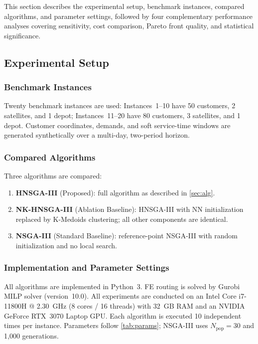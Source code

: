 \documentclass[11pt, a4paper]{article}
\numberwithin{equation}{section}
\begin{document}
This section describes the experimental setup, benchmark instances, compared
algorithms, and parameter settings, followed by four complementary performance
analyses covering sensitivity, cost comparison, Pareto front quality, and
statistical significance.

\subsection{Experimental Setup}

\subsubsection{Benchmark Instances}

Twenty benchmark instances are used: Instances~1--10 have 50 customers,
2 satellites, and 1 depot; Instances~11--20 have 80 customers, 3 satellites,
and 1 depot.  Customer coordinates, demands, and soft service-time windows
are generated synthetically over a multi-day, two-period horizon.

\subsubsection{Compared Algorithms}

Three algorithms are compared:
\begin{enumerate}
  \item \textbf{HNSGA-III} (Proposed): full algorithm as described in
        \cref{sec:alg}.
  \item \textbf{NK-HNSGA-III} (Ablation Baseline): HNSGA-III with NN
        initialization replaced by K-Medoids clustering; all other components
        are identical.
  \item \textbf{NSGA-III} (Standard Baseline): reference-point NSGA-III
        \cite{deb2014nsga3} with random initialization and no local search.
\end{enumerate}

\subsubsection{Implementation and Parameter Settings}

All algorithms are implemented in Python~3.  FE routing is solved by Gurobi
MILP solver (version~10.0).  All experiments are conducted on an Intel Core i7-11800H @
2.30~GHz (8 cores / 16 threads) with 32~GB RAM and an NVIDIA GeForce RTX~3070
Laptop GPU\@.  Each algorithm is executed 10 independent times per instance.
Parameters follow \cref{tab:params}; NSGA-III uses $N_{\mathrm{pop}}=30$ and
1{,}000 generations.
\end{document}
